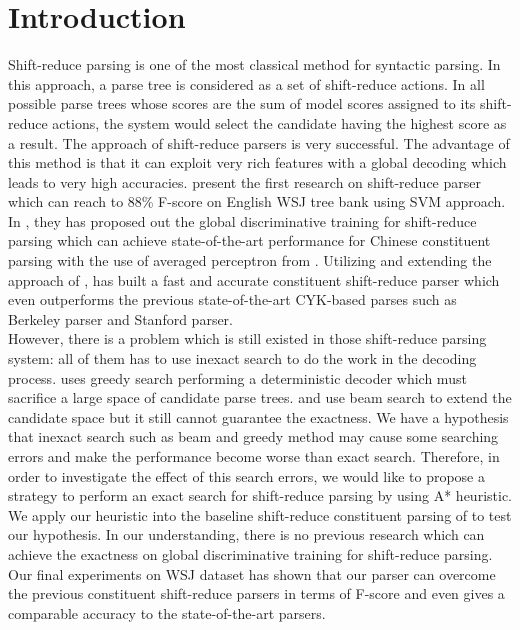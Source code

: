 \section {Introduction}
Shift-reduce parsing is one of the most classical method for syntactic parsing. In this approach, a parse tree is considered as a set of shift-reduce actions. In all possible parse trees whose scores are the sum of model scores assigned to its shift-reduce actions, the system would select the candidate having the highest score as a result. The approach of shift-reduce parsers is very successful. The advantage of this method is that it can exploit very rich features with a global decoding which leads to very high accuracies. \cite{2006Wang} present the first research on shift-reduce parser which can reach to 88\% F-score on English WSJ tree bank using SVM approach. In \cite{2009Zhang}, they has proposed out the global discriminative training for shift-reduce parsing which can achieve state-of-the-art performance for Chinese constituent parsing with the use of averaged perceptron from \cite{2004Collins}. Utilizing and extending the approach of \cite{2009Zhang}, \cite{2012Zhu} has built a fast and accurate constituent shift-reduce parser which even outperforms the previous state-of-the-art CYK-based parses such as Berkeley parser and Stanford parser.\\
\indent However, there is a problem which is still existed in those shift-reduce parsing system: all of them has to use inexact search to do the work in the decoding process. \cite{2006Wang} uses greedy search performing a deterministic decoder which must sacrifice a large space of candidate parse trees. \cite{2009Zhang} and \cite{2012Zhu} use beam search to extend the candidate space but it still cannot guarantee the exactness. We have a hypothesis that inexact search such as beam and greedy method may cause some searching errors and make the performance become worse than exact search. Therefore, in order to investigate the effect of this search errors, we would like to propose a strategy to perform an exact search for shift-reduce parsing by using A* heuristic. We apply our heuristic into the baseline shift-reduce constituent parsing of \cite{2009Zhang} to test our hypothesis. In our understanding, there is no previous research which can achieve the exactness on global discriminative training for shift-reduce parsing. Our final experiments on WSJ dataset has shown that our parser can overcome the previous constituent shift-reduce parsers in terms of F-score and even gives a comparable accuracy to the state-of-the-art parsers.
